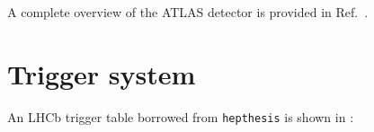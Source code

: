 A complete overview of the ATLAS detector is provided in Ref.~\cite{PERF-2007-01}.


%
%
%

\section{Trigger system}
\label{sec:bg-theory:triggers}
An LHCb trigger table borrowed from \texttt{hepthesis} is shown in :

